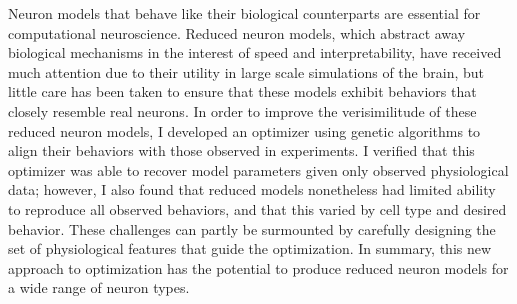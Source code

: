 Neuron models that behave like their biological counterparts are essential for computational neuroscience.
Reduced neuron models, which abstract away biological mechanisms in the interest of speed and interpretability, have received much attention due to their utility in large scale simulations of the brain, but little care has been taken to ensure that these models exhibit behaviors that closely resemble real neurons.
In order to improve the verisimilitude of these reduced neuron models, I developed an optimizer using genetic algorithms to align their behaviors with those observed in experiments.
I verified that this optimizer was able to recover model parameters given only observed physiological data; however, I also found that reduced models nonetheless had limited ability to reproduce all observed behaviors, and that this varied by cell type and desired behavior.
These challenges can partly be surmounted by carefully designing the set of physiological features that guide the optimization.
In summary, this new approach to optimization has the potential to produce reduced neuron models for a wide range of neuron types.




